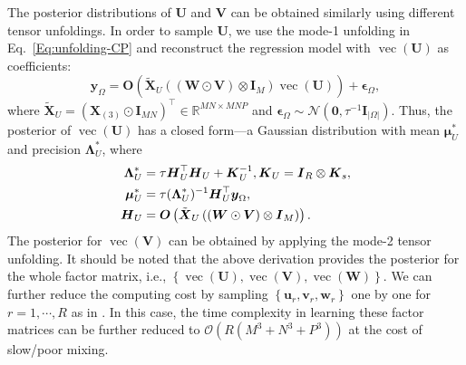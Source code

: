 \documentclass[12pt]{article}
\newcommand{\given}{\;\middle|\;}
\newcommand{\bd}[1]{\boldsymbol{#1}}
\begin{document}
The posterior distributions of $\boldsymbol{U}$ and $\boldsymbol{V}$ can be obtained similarly using different tensor unfoldings. In order to sample $\boldsymbol{U}$, we use the mode-1 unfolding in Eq.~\eqref{Eq:unfolding-CP} and reconstruct the regression model with $\operatorname{vec}(\bd{U})$ as coefficients: %
\begin{equation} \label{Eq:YonU}
\boldsymbol{y}_{\Omega}=\boldsymbol{O}\left(\tilde{\bd{X}}_{U}\left((\boldsymbol{W}\odot\boldsymbol{V})\otimes\boldsymbol{I}_{M}\right)\operatorname{vec}(\boldsymbol{U})\right)+\boldsymbol{\epsilon}_{\Omega},
\end{equation}
where {{$\tilde{\bd{X}}_{U}=\left(\boldsymbol{X}_{(3)}\odot\boldsymbol{I}_{MN}\right)^{\top}\in\mathbb{R}^{MN\times MNP}$}} and  $\boldsymbol{\epsilon}_{\Omega}\sim\mathcal{N}\left(\boldsymbol{0},\tau^{-1}\boldsymbol{I}_{|\Omega|}\right)$. Thus, the posterior of $\operatorname{vec}(\boldsymbol{U})$ has a closed form---a Gaussian distribution with mean $\boldsymbol{\mu}_{U}^{*}$ and precision $\boldsymbol{\Lambda}_{U}^{*}$, where
\begin{equation}\notag
\begin{aligned}
    \boldsymbol{\Lambda}_{U}^{*}&=\tau\boldsymbol{H}_{U}^{\top}\boldsymbol{H}_{U}+\boldsymbol{K}_{U}^{-1}, \boldsymbol{K}_{U}=\boldsymbol{I}_{R}\otimes\boldsymbol{K}_{s}, \\
    \boldsymbol{\mu}_{U}^{*}&=\tau(\boldsymbol{\Lambda}_{U}^{*})^{-1}\boldsymbol{H}_{U}^{\top}\boldsymbol{y}_{\Omega}, \\
    \boldsymbol{H}_{U}&=\boldsymbol{O}\left(\tilde{\bd{X}}_{U}\left((\boldsymbol{W}\odot\boldsymbol{V})\otimes\boldsymbol{I}_{M}\right)\right).
\end{aligned}
\end{equation}
The posterior for  $\operatorname{vec}(\boldsymbol{V})$ can be obtained by applying the mode-2 tensor unfolding. It should be noted that the above derivation provides the posterior for the whole factor matrix, i.e., $\left\{\operatorname{vec}(\bd{U}),\operatorname{vec}(\bd{V}),\operatorname{vec}(\bd{W})\right\}$. We can further reduce the computing cost by sampling $\left\{\bd{u}_r,\boldsymbol{v}_{r},\boldsymbol{w}_{r}\right\}$ one by one for $r=1,\cdots,R$ as in \citet{luttinen2009variational}. In this case, the time complexity in learning these factor matrices can be further reduced to $\mathcal{O}(R(M^3+N^3+P^3))$ at the cost of slow/poor mixing.
\end{document}
